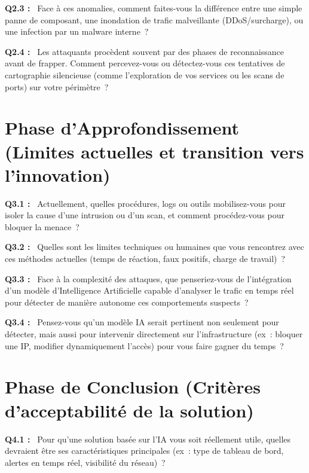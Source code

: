 \documentclass[12pt,a4paper]{report}
\newcommand{\og}{\guillemotleft\,}
\newcommand{\fg}{\,\guillemotright}
\begin{document}
\bigskip

\textbf{Q2.3 :} \og{} Face \`{a} ces anomalies, comment faites-vous la diff\'{e}rence entre une simple panne de composant, une inondation de trafic malveillante (DDoS/surcharge), ou une infection par un malware interne~? \fg{}

\bigskip

\textbf{Q2.4 :} \og{} Les attaquants proc\`{e}dent souvent par des phases de reconnaissance avant de frapper. Comment percevez-vous ou d\'{e}tectez-vous ces tentatives de cartographie silencieuse (comme l'exploration de vos services ou les scans de ports) sur votre p\'{e}rim\`{e}tre~? \fg{}

\section{Phase d'Approfondissement (Limites actuelles et transition vers l'innovation)}

\textbf{Q3.1 :} \og{} Actuellement, quelles proc\'{e}dures, logs ou outils mobilisez-vous pour isoler la cause d'une intrusion ou d'un scan, et comment proc\'{e}dez-vous pour bloquer la menace~? \fg{}

\bigskip

\textbf{Q3.2 :} \og{} Quelles sont les limites techniques ou humaines que vous rencontrez avec ces m\'{e}thodes actuelles (temps de r\'{e}action, faux positifs, charge de travail)~? \fg{}

\bigskip

\textbf{Q3.3 :} \og{} Face \`{a} la complexit\'{e} des attaques, que penseriez-vous de l'int\'{e}gration d'un mod\`{e}le d'Intelligence Artificielle capable d'analyser le trafic en temps r\'{e}el pour d\'{e}tecter de mani\`{e}re autonome ces comportements suspects~? \fg{}

\bigskip

\textbf{Q3.4 :} \og{} Pensez-vous qu'un mod\`{e}le IA serait pertinent non seulement pour d\'{e}tecter, mais aussi pour intervenir directement sur l'infrastructure (ex~: bloquer une IP, modifier dynamiquement l'acc\`{e}s) pour vous faire gagner du temps~? \fg{}

\section{Phase de Conclusion (Critères d'acceptabilité de la solution)}

\textbf{Q4.1 :} \og{} Pour qu'une solution bas\'{e}e sur l'IA vous soit r\'{e}ellement utile, quelles devraient \^{e}tre ses caract\'{e}ristiques principales (ex~: type de tableau de bord, alertes en temps r\'{e}el, visibilit\'{e} du r\'{e}seau)~? \fg{}
\end{document}
